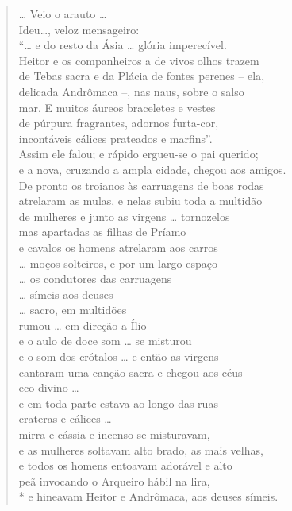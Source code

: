\begin{verse}
\ldots{} Veio o arauto \ldots{}\\
Ideu\ldots{}, veloz mensageiro:\\
``\ldots{} e do resto da Ásia \ldots{} glória imperecível.\\
Heitor e os companheiros a de vivos olhos trazem\\
de Tebas sacra e da Plácia de fontes perenes -- ela,\\
delicada Andrômaca --, nas naus, sobre o salso\\
mar. E muitos áureos braceletes e vestes\\
de púrpura fragrantes, adornos furta-cor,\\
incontáveis cálices prateados e marfins''.\\
Assim ele falou; e rápido ergueu-se o pai querido;\\
e a nova, cruzando a ampla cidade, chegou aos amigos.\\
De pronto os troianos às carruagens de boas rodas\\
atrelaram as mulas, e nelas subiu toda a multidão \\
de mulheres e junto as virgens \ldots{} tornozelos\\
mas apartadas as filhas de Príamo\\
e cavalos os homens atrelaram aos carros\\
\ldots{} moços solteiros, e por um largo espaço \\
\ldots{} os condutores das carruagens \\
\ldots{} símeis aos deuses\\
\ldots{} sacro, em multidões\\
rumou \ldots{} em direção a Ílio\\
e o aulo de doce som \ldots{} se misturou\\
e o som dos crótalos \ldots{} e então as virgens\\
cantaram uma canção sacra e chegou aos céus\\
eco divino \ldots{}\\
e em toda parte estava ao longo das ruas\\
crateras e cálices \ldots{}\\
mirra e cássia e incenso se misturavam,\\
e as mulheres soltavam alto brado, as mais velhas,\\
e todos os homens entoavam adorável e alto\\
peã invocando o Arqueiro hábil na lira,\\*
e hineavam Heitor e Andrômaca, aos deuses símeis.
\end{verse}

